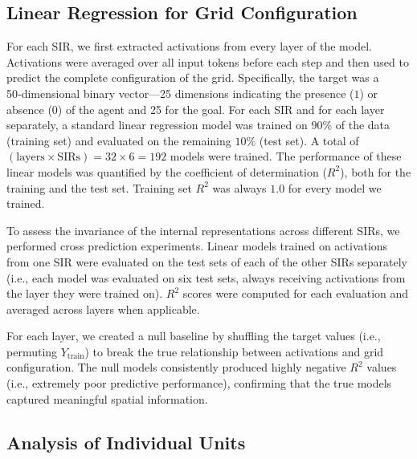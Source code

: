 \documentclass[runningheads]{llncs}
\begin{document}
\subsection{Linear Regression for Grid Configuration}

For each SIR, we first extracted activations from every layer of the model. Activations were averaged over all input tokens before each step and then used to predict the complete configuration of the grid. Specifically, the target was a 50‑dimensional binary vector—25 dimensions indicating the presence ($1$) or absence ($0$) of the agent and 25 for the goal. For each SIR and for each layer separately, a standard linear regression model was trained on $90\%$ of the data (training set) and evaluated on the remaining $10\%$ (test set). A total of $(\mathrm{layers}\times\mathrm{SIRs}) = 32\times 6 = 192$ models were trained. The performance of these linear models was quantified by the coefficient of determination ($R^2$), both for the training and the test set. Training set $R^2$ was always $1.0$ for every model we trained.

To assess the invariance of the internal representations across different SIRs, we performed cross prediction experiments. Linear models trained on activations from one SIR were evaluated on the test sets of each of the other SIRs separately (i.e., each model was evaluated on six test sets, always receiving activations from the layer they were trained on). $R^2$ scores were computed for each evaluation and averaged across layers when applicable.

For each layer, we created a null baseline by shuffling the target values (i.e., permuting $Y_{\text{train}}$) to break the true relationship between activations and grid configuration. The null models consistently produced highly negative $R^2$ values (i.e., extremely poor predictive performance), confirming that the true models captured meaningful spatial information.

\subsection{Analysis of Individual Units}
\end{document}
